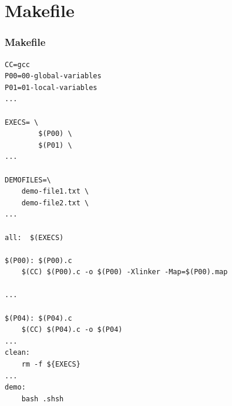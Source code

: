 \documentclass[aspectratio=169, xcolor=table, notheorems, hyperref={pdfpagelabels=false}]{beamer}
\begin{document}
\section{Makefile}
\begin{frame}[fragile]
\frametitle{Makefile}
\begin{lstlisting}[basicstyle=\ttfamily\tiny]
CC=gcc
P00=00-global-variables
P01=01-local-variables
...
	
EXECS= \
        $(P00) \
        $(P01) \
...

DEMOFILES=\
	demo-file1.txt \
	demo-file2.txt \
...

all:  $(EXECS)

$(P00): $(P00).c
	$(CC) $(P00).c -o $(P00) -Xlinker -Map=$(P00).map

...

$(P04): $(P04).c
	$(CC) $(P04).c -o $(P04)
...
clean:
	rm -f ${EXECS} 
...
demo:
	bash .shsh
\end{lstlisting}
\end{frame}


\end{document}
